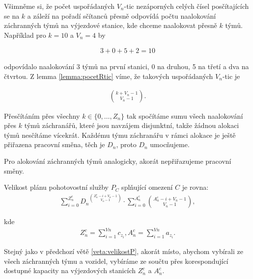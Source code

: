 \begin{dukaz}
  Všimněme si, že počet uspořádaných $V_n$-tic nezáporných celých čísel posčítajících se na $k$
  a záleží na pořadí sčítanců přesně odpovídá počtu naalokování záchranných týmů na výjezdové stanice, kde chceme naalokovat přesně $k$ týmů.
  Například pro $k = 10$ a $V_n = 4$ by

  \begin{align*}
    3 + 0 + 5 + 2 = 10
  \end{align*}

  odpovídalo naalokování 3 týmů na první stanici, 0 na druhou, 5 na třetí a dva na čtvrtou.
  Z lemma \ref{lemma:pocetRtic} víme, že takových uspořádaných $V_n$-tic je

  \begin{align}
    \binom{k + V_n - 1}{V_n - 1}.
  \end{align}

  Přesčítáním přes všechny $k \in \{ 0, \dots, Z_n \}$ tak spočítáme sumu všech naalokování přes $k$ týmů záchranářů, které jsou navzájem disjunktní, takže žádnou alokaci týmů nesčítáme vícekrát.
  Každému týmu záchranářu v rámci alokace je ještě přiřazena pracovní směna, těch je $D_n$, proto $D_n$ umocňujeme. 

  Pro alokování záchranných týmů analogicky, akorát nepřiřazujeme pracovní směny.
\end{dukaz}

\begin{veta}
  Velikost plánu pohotovostní služby $P_C$ splňující omezení $C$ je rovna:
  \begin{align*}
    \sum_{i=0}^{Z^c_n}{{D_n}^{\binom{Z^c_n - i + V_n - 1}{V_n - 1}}} \cdot \sum_{i = 0}^{A^c_n}\binom{A^c_n - i + V_n - 1}{V_n - 1},
  \end{align*}

  kde
  \begin{align*}
    Z^c_n = \sum_{i=1}^{Vn} c_{z_{i}}, A^c_n = \sum_{i=1}^{Vn} a_{z_{i}}.
  \end{align*}
\end{veta}

\begin{dukaz}
  Stejný jako v předchozí větě \ref{veta:velikostP}, akorát místo, abychom vybírali ze všech záchranných týmu a vozidel,
  vybíráme ze součtu přes korespondující dostupné kapacity na výjezdových stanicích $Z^c_n$ a $A^c_n$.
\end{dukaz}

